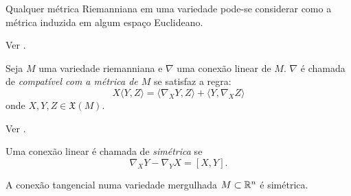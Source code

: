 \begin{teorema}
	Qualquer métrica Riemanniana em uma variedade pode-se considerar como a métrica induzida em algum espaço Euclideano.
\end{teorema}

\begin{demonstracao}
	Ver \cite[Theorem 3]{Nash1956}.
\end{demonstracao}

\begin{proposicao}
	Seja $M$ uma variedade riemanniana e
	$\nabla$ uma conexão linear de $M$.
	$\nabla$ é chamada de \emph{compatível com a métrica de $M$} se satisfaz a regra:
	\begin{equation*}
		X \langle Y,Z \rangle = \langle \nabla_X Y, Z \rangle + \langle Y, \nabla_X Z \rangle
	\end{equation*}
	onde $X,Y,Z \in \mathfrak{X}(M)$.
\end{proposicao}

\begin{demonstracao}
	Ver \cite[Cap. 2, corolário 3.3]{Carmo1988}.
\end{demonstracao}


\begin{definicao}
	Uma conexão linear é chamada de \emph{simétrica} se
	\begin{equation*}
		\nabla_X Y - \nabla_Y X = [X,Y].
	\end{equation*}
\end{definicao}

\begin{lema}\label{conexao-tangencial-simetrica}
	A conexão tangencial numa variedade mergulhada $M \subset \mathbb{R}^n$ é simétrica.
\end{lema}

